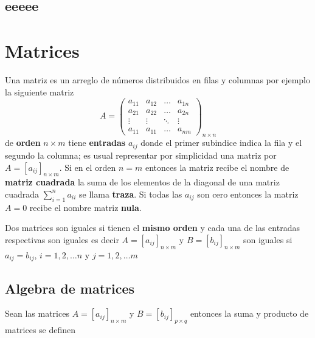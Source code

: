 \documentclass[10pt,]{krantz}
\theoremstyle{definition}
\theoremstyle{definition}
\theoremstyle{definition}
\theoremstyle{remark}
\begin{document}
\hypertarget{eeeee}{%
\section{eeeee}\label{eeeee}}

\hypertarget{matrices}{%
\chapter{Matrices}\label{matrices}}

Una matriz es un arreglo de números distribuidos en filas y columnas por ejemplo la siguiente matriz
\[A=\begin{pmatrix}
a_{11}&a_{12}&\ldots&a_{1n}\\
a_{21}&a_{22}&\ldots&a_{2n}\\
\vdots & \vdots & \ddots &\vdots \\
a_{11}&a_{11}&\ldots&a_{nm}
\end{pmatrix}_{n\times n}\]
de \textbf{orden} \(n\times m\) tiene \textbf{entradas} \(a_{ij}\) donde el primer subindice indica la fila y el segundo la columna; es usual representar por simplicidad una matriz por \(A=[a_{ij}]_{n\times m}\). Si en el orden \(n=m\) entonces la matriz recibe el nombre de \textbf{matriz cuadrada} la suma de los elementos de la diagonal de una matriz cuadrada \(\sum_{i=1}^na_{ii}\) se llama \textbf{traza}. Si todas las \(a_{ij}\) son cero entonces la matriz \(A=0\) recibe el nombre matriz \textbf{nula}.

Dos matrices son iguales si tienen el \textbf{mismo orden} y cada una de las entradas respectivas son iguales es decir \(A=[a_{ij}]_{n\times m}\) y \(B=[b_{ij}]_{n\times m}\) son iguales si \(a_{ij}=b_{ij}\), \(i=1,2,\ldots n\) y \(j=1,2,\ldots m\)

\hypertarget{algebra-de-matrices}{%
\section{Algebra de matrices}\label{algebra-de-matrices}}

Sean las matrices \(A=[a_{ij}]_{n\times m}\) y \(B=[b_{ij}]_{p\times q}\) entonces la suma y producto de matrices se definen
\end{document}
